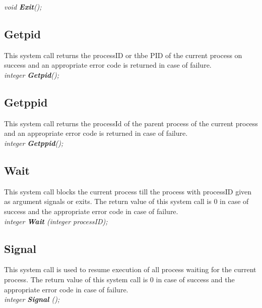 \documentclass[11pt]{article}
\begin{document}
\textit{void \textbf{Exit}();}



\subsection{Getpid}
This system call returns the processID or thbe PID of the current process on success and an appropriate error code is returned in case of failure. \\

\textit{integer \textbf{Getpid}();}


\subsection{Getppid}
This system call returns the processId of the parent process of the current process and an appropriate error code is returned in case of failure.\\

\textit{integer \textbf{Getppid}();}



\subsection{Wait}
This system call blocks the current process till the process with processID given as argument signals or exits.  The return value of this system call is 0 in case of success and the appropriate error code in case of failure. \\

\textit{integer \textbf{Wait} (integer processID);}



\subsection{Signal}
This system call is used to resume execution of all process waiting for the current process.  The return value of this system call is 0 in case of success and the appropriate error code in case of failure.\\

\textit{integer \textbf{Signal} ();}
\end{document}
